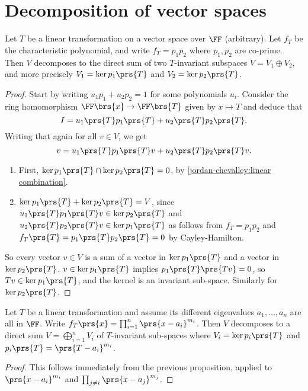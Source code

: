 \documentclass[10pt,a4paper,twoside,openany,hidelinks]{book}
\begin{document}
\section{Decomposition of vector spaces}
\begin{proposition}
Let $T$ be a linear transformation on a vector space over $\FF$ (arbitrary).
Let $f_T$ be the characteristic polynomial, and write $f_T = p_1 p_2$ where $p_1,p_2$ are co-prime.
Then $V$ decomposes to the direct sum of two $T$-invariant subspaces
$V = V_1 \oplus V_2$, and more precisely $V_1 = \ker p_1\prs{T}$ and $V_2 = \ker p_2\prs{T}$.
\end{proposition}
\begin{proof}
Start by writing $u_1p_1 + u_2p_2 = 1$ for some polynomials $u_i$. Consider the ring homomorphism $\FF\brs{x} \to \FF\brs{T}$ given by $x \mapsto T$ and deduce that \[I = u_1\prs{T}p_1\prs{T} + u_2\prs{T}p_2\prs{T}\text{.}\]
Writing that again for all $v \in V$, we get
\begin{equation} \label{jordan-chevalley:linear combination}
v = u_1\prs{T} p_1\prs{T} v + u_2\prs{T} p_2\prs{T} v \text{.}
\end{equation}
\begin{enumerate}[label = (\roman*)]
\item First, $\ker p_1\prs{T} \cap \ker p_2\prs{T} = 0$, by \eqref{jordan-chevalley:linear combination}.
\item $\ker p_1\prs{T} + \ker p_2\prs{T} = V$, since $u_1\prs{T} p_1\prs{T}v \in \ker p_2\prs{T}$ and $u_2\prs{T} p_2\prs{T}v \in \ker p_1\prs{T}$ as follows from $f_T = p_1 p_2$ and $f_T\prs{T} = p_1\prs{T} p_2\prs{T} = 0$ by Cayley-Hamilton.
\end{enumerate}
So every vector $v \in V$ is a sum of a vector in $\ker p_1 \prs{T}$ and a vector in $\ker p_2 \prs{T}$.
$v \in \ker p_1\prs{T}$ implies $p_1\prs{T}\prs{Tv} = 0$, so $Tv \in \ker p_1\prs{T}$, and the kernel is an invariant sub-space. Similarly for $\ker p_2\prs{T}$.
\end{proof}
\begin{proposition}
Let $T$ be a linear transformation and assume its different eigenvalues
$a_1, \ldots, a_n$ are all in $\FF$. Write $f_T\prs{x} = \prod_{i=1}^n \prs{x-a_i}^{m_i}$. Then $V$ decomposes to a direct sum $V = \bigoplus_{i=1}^n V_i$ of $T$-invariant sub-spaces where $V_i = \ker p_i\prs{T}$ and $p_i\prs{T} = \prs{T-a_i}^{m_i}$.
\end{proposition}
\begin{proof}
This follows immediately from the previous proposition, applied to $\prs{x-a_i}^{m_i}$ and $\prod_{j\neq i}\prs{x-a_j}^{m_j}$.
\end{proof}
\end{document}

